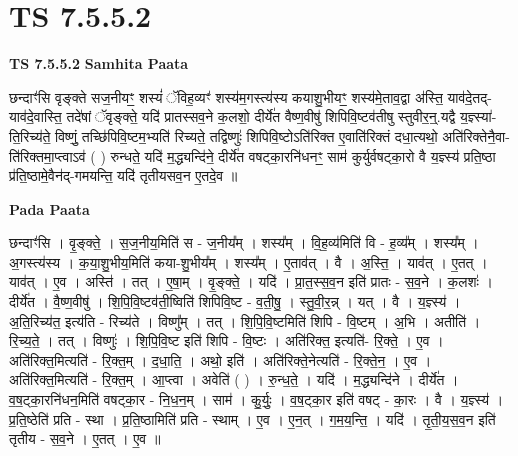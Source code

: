 \documentclass[17pt]{extarticle}
\begin{document}

\section{ TS 7.5.5.2 }

\textbf{TS 7.5.5.2 } \newline
\textbf{Samhita Paata} \newline

छन्दाꣳ॑सि वृङ्क्ते सज॒नीयꣳ॒॒ शस्यं॑ ॅविह॒व्यꣳ॑ शस्य॑म॒गस्त्य॑स्य कयाशु॒भीयꣳ॒॒ शस्य॑मे॒ताव॒द्वा अ॑स्ति॒ याव॑दे॒तद्-याव॑दे॒वास्ति॒ तदे॑षां ॅवृङ्क्ते॒ यदि॑ प्रातस्सव॒ने क॒लशो॒ दीर्ये॑त वैष्ण॒वीषु॑ शिपिवि॒ष्टव॑तीषु स्तुवीर॒न्॒.यद्वै य॒ज्ञ्स्या॑-ति॒रिच्य॑ते॒ विष्णुं॒ तच्छि॑पिवि॒ष्टम॒भ्यति॑ रिच्यते॒ तद्विष्णुः॑ शिपिवि॒ष्टोऽति॑रिक्त ए॒वाति॑रिक्तं दधा॒त्यथो॒ अति॑रिक्तेनै॒वा-ति॑रिक्तमा॒प्त्वाऽव॑ ( ) रुन्धते॒ यदि॑ म॒द्ध्यन्दि॑ने॒ दीर्ये॑त वषट्का॒रनि॑धनꣳ॒॒ साम॑ कुर्युर्वषट्का॒रो वै य॒ज्ञ्स्य॑ प्रति॒ष्ठा प्र॑ति॒ष्ठामे॒वैन॑द्-गमयन्ति॒ यदि॑ तृतीयसव॒न ए॒तदे॒व ॥ \newline

\textbf{Pada Paata} \newline

छन्दाꣳ॑सि । वृ॒ङ्क्ते॒ । स॒ज॒नीय॒मिति॑ स - ज॒नीय᳚म् । शस्य᳚म् । वि॒ह॒व्य॑मिति॑ वि - ह॒व्य᳚म् । शस्य᳚म् । अ॒गस्त्य॑स्य । क॒या॒शु॒भीय॒मिति॑ कया-शु॒भीय᳚म् । शस्य᳚म् । ए॒ताव॑त् । वै । अ॒स्ति॒ । याव॑त् । ए॒तत् । याव॑त् । ए॒व । अस्ति॑ । तत् । ए॒षा॒म् । वृ॒ङ्क्ते॒ । यदि॑ । प्रा॒त॒स्स॒व॒न इति॑ प्रातः - स॒व॒ने । क॒लशः॑ । दीर्ये॑त । वै॒ष्ण॒वीषु॑ । शि॒पि॒वि॒ष्टव॑ती॒ष्विति॑ शिपिवि॒ष्ट - व॒ती॒षु॒ । स्तु॒वी॒र॒न्न् । यत् । वै । य॒ज्ञ्स्य॑ । अ॒ति॒रिच्य॑त॒ इत्य॑ति - रिच्य॑ते । विष्णु᳚म् । तत् । शि॒पि॒वि॒ष्टमिति॑ शिपि - वि॒ष्टम् । अ॒भि । अतीति॑ । रि॒च्य॒ते॒ । तत् । विष्णुः॑ । शि॒पि॒वि॒ष्ट इति॑ शिपि - वि॒ष्टः । अति॑रिक्त॒ इत्यति॑- रि॒क्ते॒ । ए॒व । अति॑रिक्त॒मित्यति॑ - रि॒क्त॒म् । द॒धा॒ति॒ । अथो॒ इति॑ । अति॑रिक्ते॒नेत्यति॑ - रि॒क्ते॒न॒ । ए॒व । अति॑रिक्त॒मित्यति॑ - रि॒क्त॒म् । आ॒प्त्वा । अवेति॑ ( ) । रु॒न्ध॒ते॒ । यदि॑ । म॒द्ध्यन्दि॑ने । दीर्ये॑त । व॒ष॒ट्का॒रनि॑धन॒मिति॑ वषट्का॒र - नि॒ध॒न॒म् । साम॑ । कु॒र्युः॒ । व॒ष॒ट्का॒र इति॑ वषट् - का॒रः । वै । य॒ज्ञ्स्य॑ । प्र॒ति॒ष्ठेति॑ प्रति - स्था । प्र॒ति॒ष्ठामिति॑ प्रति - स्थाम् । ए॒व । ए॒न॒त् । ग॒म॒य॒न्ति॒ । यदि॑ । तृ॒ती॒य॒स॒व॒न इति॑ तृतीय - स॒व॒ने । ए॒तत् । ए॒व ॥  \newline




\end{document}
